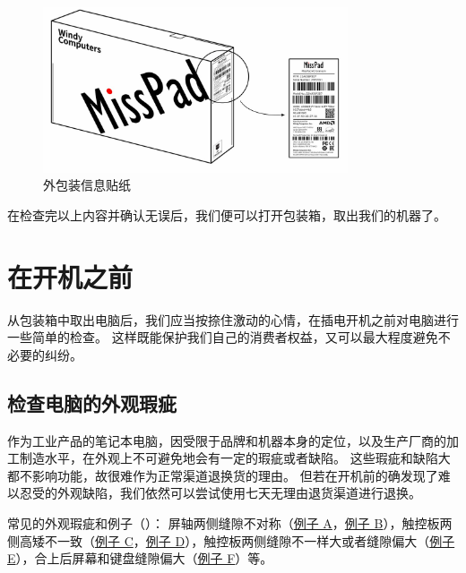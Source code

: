 \begin{figure}[htb!]
  \centering
  \includegraphics[width=9cm]{assets/Pack_Info.jpg}
  \caption{外包装信息贴纸}
  \label{pack-info}
\end{figure}

在检查完以上内容并确认无误后，我们便可以打开包装箱，取出我们的机器了。

\section{在开机之前}

从包装箱中取出电脑后，我们应当按捺住激动的心情，在插电开机之前对电脑进行一些简单的检查。
这样既能保护我们自己的消费者权益，又可以最大程度避免不必要的纠纷。

\subsection{检查电脑的外观瑕疵}

作为工业产品的笔记本电脑，因受限于品牌和机器本身的定位，以及生产厂商的加工制造水平，在外观上不可避免地会有一定的瑕疵或者缺陷。
这些瑕疵和缺陷大都不影响功能，故很难作为正常渠道退换货的理由。
但若在开机前的确发现了难以忍受的外观缺陷，我们依然可以尝试使用七天无理由退货渠道进行退换。

常见的外观瑕疵和例子（）：
屏轴两侧缝隙不对称（\href{https://tousu.sina.com.cn/complaint/view/17351828965}{例子 A}，\href{https://club.huawei.com/thread-29980049-1-1.html}{例子 B}），触控板两侧高矮不一致（\href{https://www.dell.com/community/%E7%81%B5%E8%B6%8A%E7%AC%94%E8%AE%B0%E6%9C%AC/%E6%8A%95%E8%AF%89-%E7%81%B5%E8%B6%8A16-Plus%E5%93%81%E6%8E%A7%E6%9E%81%E5%B7%AE-%E5%94%AE%E5%90%8E%E4%B8%8D%E4%BD%9C%E4%B8%BA/td-p/8025463}{例子 C}，\href{https://www.zhihu.com/question/445434723}{例子 D}），触控板两侧缝隙不一样大或者缝隙偏大（\href{https://club.huawei.com/thread-30382374-1-1.html}{例子 E}），合上后屏幕和键盘缝隙偏大（\href{https://www.zhihu.com/question/265987549}{例子 F}）等。

